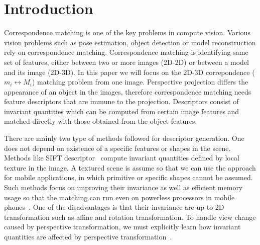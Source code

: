 \documentclass{bmvc2k}
\begin{document}
\section{Introduction}
\label{sec:intro}
Correspondence matching is one of the key problems in compute vision. Various vision problems such as pose estimation, object detection or model reconstruction rely on correspondence matching. 
Correspondence matching is identifying same set of features, either between two or more images (2D-2D) or between a model and its image (2D-3D). In this paper we will focus on the 2D-3D correpondence ($ m_i \leftrightarrow M_i $) matching problem from one image. 
Perspective projection differs the appearance of an object in the images, therefore correspondence matching needs feature descriptors that are immune to the projection. Descriptors consist of invariant quantities which can be computed from certain image features and matched directly with those obtained from the object features. 

There are mainly two type of methods followed for descriptor generation. One does not depend on existence of a specific features or shapes in the scene. 
Methods like SIFT descriptor~\cite{Lowe1999} compute invariant quantities defined by local texture in the image.
A textured scene is assume so that we can use the approach for mobile applications, in which primitive or specific shapes cannot be assumed.
Such methods focus on improving their invariance as well as efficient memory usage so that the matching can run even on powerless processors in mobile phones~\cite{Ke2004,Calonder2010}.
One of the disadvantages is that their invariance are up to 2D transformation such as affine and rotation transformation.
To handle view change caused by perspective transformation, we must explicitly learn how invariant quantities are affected by perspective transformation~\cite{Kurz2012,Lepetit2006}. 
\end{document}

